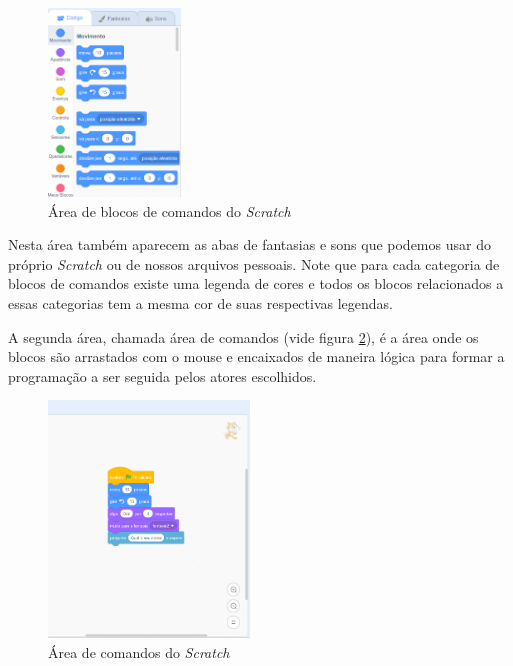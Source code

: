 \documentclass[12pt, openright, a4paper, brazil, english, french, spanish, bibjustif, openany, oneside]{abntex2}
\begin{document}
\begin{figure}[H]

    \center
    \caption{Área de blocos de comandos do \textit{Scratch} \label{scr2}}
    \includegraphics[height=5cm]{scratch2.png}
    
\end{figure}


Nesta área também aparecem as abas de fantasias e sons que podemos usar do próprio \textit{Scratch} ou de nossos arquivos pessoais. Note que para cada categoria de blocos de comandos existe uma legenda de cores e todos os blocos relacionados a essas categorias tem a mesma cor de suas respectivas legendas.

A segunda área, chamada área de comandos (vide figura \ref{scr3}), é a área onde os blocos são arrastados com o mouse e encaixados de maneira lógica para formar a programação a ser seguida pelos atores escolhidos.

\begin{figure}[H]

    \center
    \caption{Área de comandos do \textit{Scratch} \label{scr3}}
    \includegraphics[height=6.3cm]{scratch3.png}
    
\end{figure}
\end{document}
